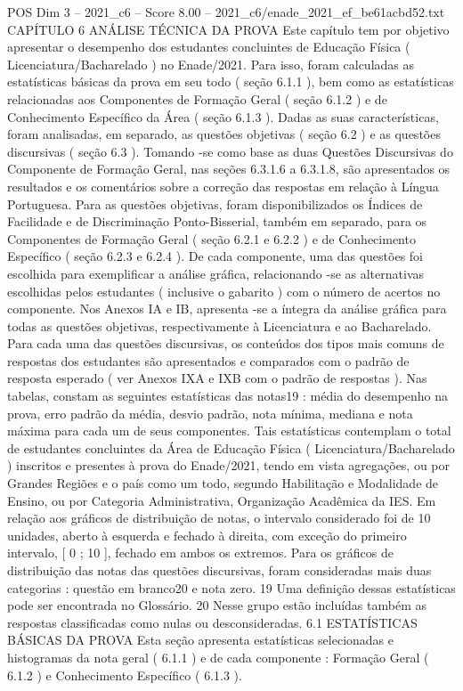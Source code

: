 \begin{textsample}{POS Dim 3 – 2021\_c6 – Score 8.00 – 2021\_c6/enade\_2021\_ef\_be61acbd52.txt}  \label{ex:f3_pos_041}
CAPÍTULO 6 ANÁLISE TÉCNICA DA PROVA Este capítulo tem por objetivo apresentar o desempenho dos estudantes concluintes de Educação Física ( Licenciatura/Bacharelado ) no Enade/2021.
Para isso, foram calculadas as estatísticas básicas da prova em seu todo ( seção 6.1.1 ), bem como as estatísticas relacionadas aos Componentes de Formação Geral ( seção 6.1.2 ) e de Conhecimento Específico da Área ( seção 6.1.3 ).
Dadas as suas características, foram analisadas, em separado, as questões objetivas ( seção 6.2 ) e as questões discursivas ( seção 6.3 ).
Tomando -se como base as duas Questões Discursivas do Componente de Formação Geral, nas seções 6.3.1.6 a 6.3.1.8, são apresentados os resultados e os comentários sobre a correção das respostas em relação à Língua Portuguesa.
Para as questões objetivas, foram disponibilizados os Índices de Facilidade e de Discriminação Ponto-Bisserial, também em separado, para os Componentes de Formação Geral ( seção 6.2.1 e 6.2.2 ) e de Conhecimento Específico ( seção 6.2.3 e 6.2.4 ).
De cada componente, uma das questões foi escolhida para exemplificar a análise gráfica, relacionando -se as alternativas escolhidas pelos estudantes ( inclusive o gabarito ) com o número de acertos no componente.
Nos Anexos IA e IB, apresenta -se a íntegra da análise gráfica para todas as questões objetivas, respectivamente à Licenciatura e ao Bacharelado.
Para cada uma das questões discursivas, os conteúdos dos tipos mais comuns de respostas dos estudantes são apresentados e comparados com o padrão de resposta esperado ( ver Anexos IXA e IXB com o padrão de respostas ).
Nas tabelas, constam as seguintes estatísticas das notas19 : média do desempenho na prova, erro padrão da média, desvio padrão, nota mínima, mediana e nota máxima para cada um de seus componentes.
Tais estatísticas contemplam o total de estudantes concluintes da Área de Educação Física ( Licenciatura/Bacharelado ) inscritos e presentes à prova do Enade/2021, tendo em vista agregações, ou por Grandes Regiões e o país como um todo, segundo Habilitação e Modalidade de Ensino, ou por Categoria Administrativa, Organização Acadêmica da IES.
Em relação aos gráficos de distribuição de notas, o intervalo considerado foi de 10 unidades, aberto à esquerda e fechado à direita, com exceção do primeiro intervalo, [ 0 ; 10 ], fechado em ambos os extremos.
Para os gráficos de distribuição das notas das questões discursivas, foram consideradas mais duas categorias : questão em branco20 e nota zero. 19 Uma definição dessas estatísticas pode ser encontrada no Glossário. 20 Nesse grupo estão incluídas também as respostas classificadas como nulas ou desconsideradas. 6.1 ESTATÍSTICAS BÁSICAS DA PROVA Esta seção apresenta estatísticas selecionadas e histogramas da nota geral ( 6.1.1 ) e de cada componente : Formação Geral ( 6.1.2 ) e Conhecimento Específico ( 6.1.3 ).

\end{textsample}
